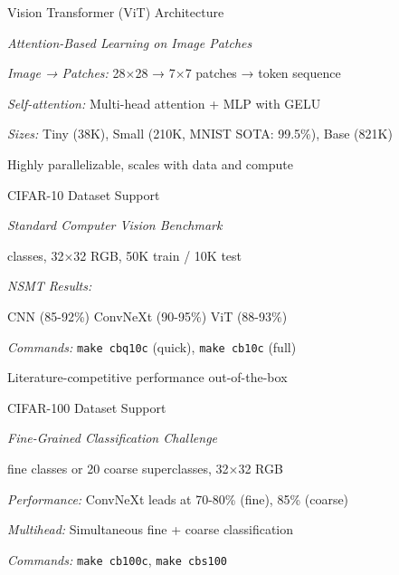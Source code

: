\begin{slide}[\slideopts,toc={ViT}]{Vision Transformer (ViT) Architecture}
  
  \emph{Attention-Based Learning on Image Patches}
  
  \begin{itemize}
    \mpitem \emph{Image → Patches:} 28×28 → 7×7 patches → token sequence
    
    \mpitem \emph{Self-attention:} Multi-head attention + MLP with GELU
    
    \mpitem \emph{Sizes:} Tiny (38K), Small (210K, MNIST SOTA: 99.5\%), Base (821K)
    
    \mpitem Highly parallelizable, scales with data and compute
  \end{itemize}
\end{slide}

\begin{slide}[\slideopts,toc={CIFAR-10}]{CIFAR-10 Dataset Support}
  
  \emph{Standard Computer Vision Benchmark}
  
  \begin{itemize}
     classes, 32×32 RGB, 50K train / 10K test
    
    \mpitem \emph{NSMT Results:}
    \begin{itemize}
      \mpitem CNN (85-92\%)
      \mpitem ConvNeXt (90-95\%)
      \mpitem ViT (88-93\%)
    \end{itemize}
    
    \mpitem \emph{Commands:} \texttt{make cbq10c} (quick), \texttt{make cb10c} (full)
    
    \mpitem Literature-competitive performance out-of-the-box
  \end{itemize}
\end{slide}

\begin{slide}[\slideopts,toc={CIFAR-100}]{CIFAR-100 Dataset Support}
  
  \emph{Fine-Grained Classification Challenge}
  
  \begin{itemize}
     fine classes or 20 coarse superclasses, 32×32 RGB
    
    \mpitem \emph{Performance:} ConvNeXt leads at 70-80\% (fine), 85\% (coarse)
    
    \mpitem \emph{Multihead:} Simultaneous fine + coarse classification
    
    \mpitem \emph{Commands:} \texttt{make cb100c}, \texttt{make cbs100}
  \end{itemize}
\end{slide}


